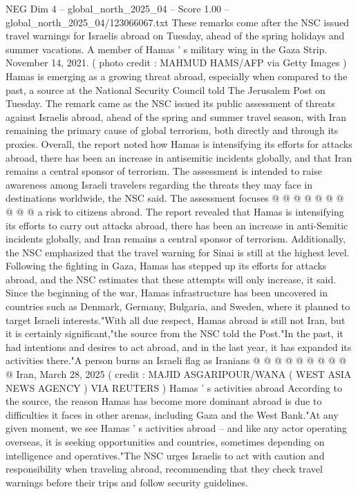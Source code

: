 \begin{textsample}{NEG Dim 4 – global\_north\_2025\_04 – Score 1.00 – global\_north\_2025\_04/123066067.txt}  \label{ex:f4_neg_245}
These remarks come after the NSC issued travel warnings for Israelis abroad on Tuesday, ahead of the spring holidays and summer vacations.
A member of Hamas ' s military wing in the Gaza Strip.
November 14, 2021. ( photo credit : MAHMUD HAMS/AFP via Getty Images ) Hamas is emerging as a growing threat abroad, especially when compared to the past, a source at the National Security Council told The Jerusalem Post on Tuesday.
The remark came as the NSC issued its public assessment of threats against Israelis abroad, ahead of the spring and summer travel season, with Iran remaining the primary cause of global terrorism, both directly and through its proxies.
Overall, the report noted how Hamas is intensifying its efforts for attacks abroad, there has been an increase in antisemitic incidents globally, and that Iran remains a central sponsor of terrorism.
The assessment is intended to raise awareness among Israeli travelers regarding the threats they may face in destinations worldwide, the NSC said.
The assessment focuses @ @ @ @ @ @ @ @ @ @ a risk to citizens abroad.
The report revealed that Hamas is intensifying its efforts to carry out attacks abroad, there has been an increase in anti-Semitic incidents globally, and Iran remains a central sponsor of terrorism.
Additionally, the NSC emphasized that the travel warning for Sinai is still at the highest level.
Following the fighting in Gaza, Hamas has stepped up its efforts for attacks abroad, and the NSC estimates that these attempts will only increase, it said.
Since the beginning of the war, Hamas infrastructure has been uncovered in countries such as Denmark, Germany, Bulgaria, and Sweden, where it planned to target Israeli interests."With all due respect, Hamas abroad is still not Iran, but it is certainly significant,"the source from the NSC told the Post."In the past, it had intentions and desires to act abroad, and in the last year, it has expanded its activities there."A person burns an Israeli flag as Iranians @ @ @ @ @ @ @ @ @ @ Iran, March 28, 2025 ( credit : MAJID ASGARIPOUR/WANA ( WEST ASIA NEWS AGENCY ) VIA REUTERS ) Hamas ' s activities abroad According to the source, the reason Hamas has become more dominant abroad is due to difficulties it faces in other arenas, including Gaza and the West Bank."At any given moment, we see Hamas ' s activities abroad -- and like any actor operating overseas, it is seeking opportunities and countries, sometimes depending on intelligence and operatives."The NSC urges Israelis to act with caution and responsibility when traveling abroad, recommending that they check travel warnings before their trips and follow security guidelines.

\end{textsample}
